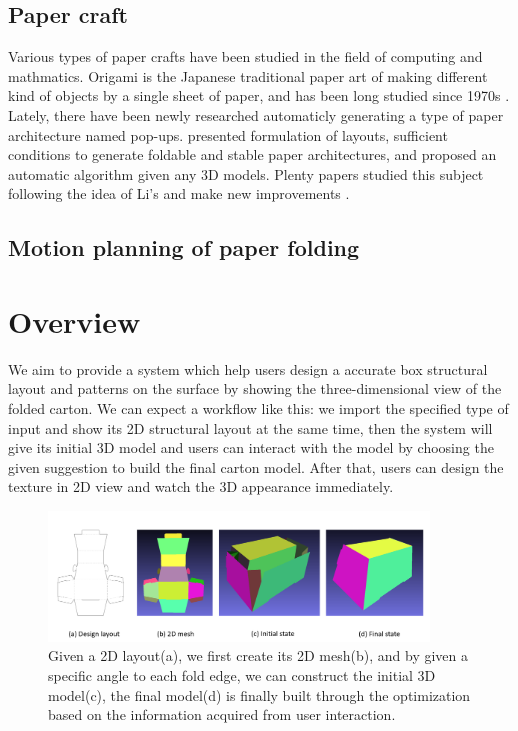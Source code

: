 \documentclass[submission]{gmp2018}
\begin{document}
\subsection{Paper craft} 
Various types of paper crafts have been studied in the field of computing and mathmatics. Origami is the Japanese traditional paper art of making different kind of objects by a single sheet of paper, and has been long studied since 1970s \cite{KANADE1980279}. Lately, there have been newly researched automaticly generating a type of paper architecture named pop-ups. \cite{Li:2010:PAP:1833349.1778848} presented formulation of layouts, sufficient conditions to generate foldable and stable paper architectures, and proposed an automatic algorithm given any 3D models. Plenty papers studied this subject following the idea of Li's and make new improvements\cite{Li:2011:GSV:1964921.1964993} \cite{Ruiz:2013:GMP:2542355.2542360} \cite{Le:2014:SCO:2574223.2574468}.

\subsection{Motion planning of paper folding}




\section{Overview}\label{sec:overview}
We aim to provide a system which help users design a accurate box structural layout and patterns on the surface by showing the three-dimensional view of the folded carton. We can expect a workflow like this: we import the specified type of input and show its 2D structural layout at the same time, then the system will give its initial 3D model and users can interact with the model by choosing the given suggestion to build the final carton model. After that, users can design the texture in 2D view and watch the 3D appearance immediately.

\begin{figure}
	\centering
	\includegraphics[width=0.9\textwidth]{images/overview.png}
	\caption{Given a 2D layout(a), we first create its 2D mesh(b), and by given a specific angle to each fold edge, we can construct the initial 3D model(c), the final model(d) is finally built through the optimization based on the information acquired from user interaction.}
	\label{fig:overview}
\end{figure} 
\end{document}

